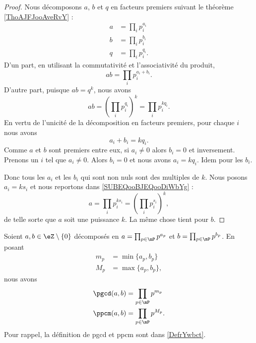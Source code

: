 \begin{proof}
	Nous décomposons \( a\), \( b\) et \( q\) en facteurs premiers suivant le théorème \ref{ThoAJFJooAveRvY} :
	\begin{subequations}
		\begin{align}
			a & = \prod_ip_i^{a_i}      \label{SUBEQooBJEQooDiWbYg} \\
			b & = \prod_ip_i^{b_i}                                  \\
			q & = \prod_{i}p_i^{q_i}.
		\end{align}
	\end{subequations}
	D'un part, en utilisant la commutativité et l'associativité du produit,
	\begin{equation}
		ab=\prod_ip_i^{a_i+b_i}.
	\end{equation}
	D'autre part, puisque \( ab=q^k\), nous avons
	\begin{equation}
		ab=(\prod_ip_i^{q_i})^k=\prod_ip_i^{kq_i}.
	\end{equation}
	En vertu de l'unicité de la décomposition en facteurs premiers, pour chaque \( i\) nous avons
	\begin{equation}
		a_i+b_i=kq_i.
	\end{equation}
	Comme \( a\) et \( b\) sont premiers entre eux, si \( a_i\neq0\) alors \( b_i=0\) et inversement. Prenons un \( i\) tel que \( a_i\neq 0\). Alors \( b_i=0\) et nous avons \( a_i=kq_i\). Idem pour les \( b_i\).

	Donc tous les \( a_i\) et les \( b_i\) qui sont non nuls sont des multiples de \( k\). Nous posons \( a_i=ks_i\) et nous reportons dans \eqref{SUBEQooBJEQooDiWbYg} :
	\begin{equation}
		a=\prod_ip_i^{ks_i}=(\prod_ip_i^{s_i})^k,
	\end{equation}
	de telle sorte que \( a\) soit une puissance \( k\)\ieme. La même chose tient pour \( b\).
\end{proof}

\begin{proposition}     \label{PROPooNQBOooHWqTvs}
	Soient \( a,b\in \eZ\setminus\{ 0 \}\) décomposés en \( a=\prod_{p\in\mP}p^{a_p}\) et \( b=\prod_{p\in\mP}p^{b_p}\). En posant
	\begin{subequations}
		\begin{align}
			m_p & = \min\{ a_p,b_p \}  \\
			M_p & = \max\{ a_p,b_p \},
		\end{align}
	\end{subequations}
	nous avons
	\begin{subequations}
		\begin{align}
			\pgcd(a,b) & = \prod_{p\in\mP}p^{m_p}  \\
			\ppcm(a,b) & = \prod_{p\in\mP}p^{M_p}.
		\end{align}
	\end{subequations}
	Pour rappel, la définition de pgcd et ppcm sont dans \ref{DefrYwbct}.
\end{proposition}

